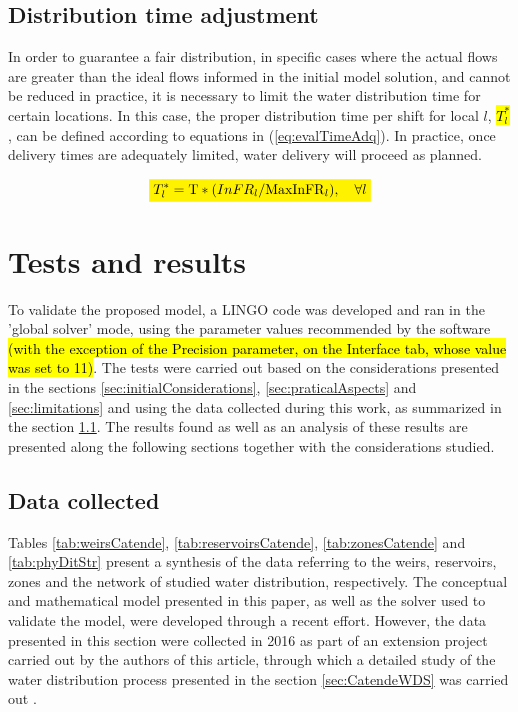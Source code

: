 \documentclass{singlecol}
\newcommand{\mathcolorbox}[2]{\colorbox{#1}{$\displaystyle #2$}}
\theoremstyle{TH}{
\newtheorem{lemma}{Lemma}
\newtheorem{theorem}[lemma]{Theorem}
\newtheorem{corrolary}[lemma]{Corrolary}
\newtheorem{conjecture}[lemma]{Conjecture}
\newtheorem{proposition}[lemma]{Proposition}
\newtheorem{claim}[lemma]{Claim}
\newtheorem{stheorem}[lemma]{Wrong Theorem}
\newtheorem{algorithm}{Algorithm}
}
\theoremstyle{THrm}{
\newtheorem{definition}{Definition}[section]
\newtheorem{question}{Question}[section]
\newtheorem{remark}{Remark}
\newtheorem{scheme}{Scheme}
}
\theoremstyle{THhit}{
\newtheorem{case}{Case}[section]
}
\begin{document}
\subsection{Distribution time adjustment}

In order to guarantee a fair distribution, in specific cases where the actual flows are greater than the ideal flows informed in the initial model solution, and cannot be reduced in practice, it is necessary to limit the water distribution time for certain locations. In this case, the proper distribution time per shift for local $l$, \hl{$T^*_{l}$}, can be defined according to equations in (\ref{eq:evalTimeAdq}). In practice, once delivery times are adequately limited, water delivery will proceed as planned.


\begin{equation}
	\mathcolorbox{yellow}{T^*_{l} = \mathrm{T} * ({InFR}_l / \mathrm{MaxInFR}_{l}), \quad \forall l}
	\label{eq:evalTimeAdq}
\end{equation}


\section{Tests and results}

To validate the proposed model, a LINGO code was developed and ran in the 'global solver' mode, using the parameter values recommended by the software \cite{LINGO} \hl{(with the exception of the Precision parameter, on the Interface tab, whose value was set to 11)}. The tests were carried out based on the considerations presented in the sections \ref{sec:initialConsiderations}, \ref{sec:praticalAspects} and \ref{sec:limitations} and using the data collected during this work, as summarized in the section \ref{sec:data}. The results found as well as an analysis of these results are presented along the following sections together with the considerations studied. 

\subsection{Data collected}
\label{sec:data}

Tables \ref{tab:weirsCatende}, \ref{tab:reservoirsCatende}, \ref{tab:zonesCatende} and \ref{tab:phyDitStr} present a synthesis of the data referring to the weirs, reservoirs, zones and the network of studied water distribution, respectively. The conceptual and mathematical model presented in this paper, as well as the solver used to validate the model, were developed through a recent effort. However, the data presented in this section were collected in 2016 as part of an extension project carried out by the authors of this article, through which a detailed study of the water distribution process presented in the section \ref{sec:CatendeWDS} was carried out \citep{CandidoEtAl2016}. 
\end{document}
